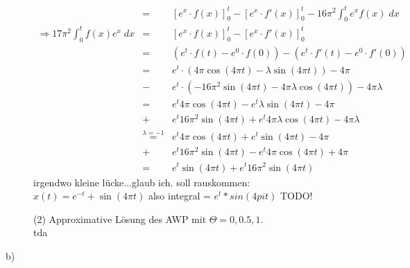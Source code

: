 \documentclass[11pt,a4paper,ngerman]{article}
\begin{document}
\begin{description}
\begin{eqnarray*}
&=& [e^{x} \cdot f(x)]_0^t - [e^{x} \cdot f'(x)]_0^t - 16 \pi^2 \int_0^t e^x f(x) \; dx \\
\Rightarrow 17 \pi^2 \int_0^t f(x)e^{x} \; dx &=& [e^{x} \cdot f(x)]_0^t - [e^{x} \cdot f'(x)]_0^t \\
&=& (e^t \cdot f(t) -  e^0 \cdot f(0)) - (e^t \cdot f'(t) -  e^0 \cdot f'(0)) \\
&=& e^t \cdot (4\pi \cos(4\pi t) - \lambda \sin(4\pi t)) - 4 \pi \\
&-& e^t \cdot (-16 \pi^2 \sin(4 \pi t) - 4 \pi \lambda \cos(4 \pi t)) - 4\pi \lambda \\
&=& e^t 4\pi \cos(4\pi t) - e^t \lambda \sin(4\pi t) - 4\pi \\
&+& e^t 16 \pi^2 \sin(4 \pi t) + e^t 4 \pi \lambda \cos(4 \pi t) - 4\pi \lambda \\
&\stackrel{\lambda = -1}{=}& e^t 4\pi \cos(4\pi t) + e^t \sin(4 \pi t) - 4\pi \\\
&+& e^t 16 \pi^2 \sin(4 \pi t) - e^t 4 \pi \cos(4 \pi t) + 4 \pi \\
&=& e^t \sin(4 \pi t) + e^t 16 \pi^2 \sin(4 \pi t)
\end{eqnarray*}
irgendwo kleine lücke...glaub ich.
soll rauskommen: 
$x(t) = e^{-t} + \sin(4\pi t)$
also integral = $e^t * sin(4pi t)$
TODO!


(2) Approximative Lösung des AWP mit $\Theta = 0, 0.5, 1$. \\
tda

\item[b)]
\end{description}




\label{LastPage}
\end{document}
